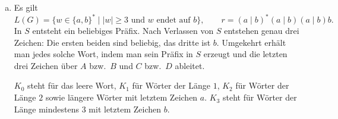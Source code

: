 \begin{loesung}
\begin{enumerate}[a)]
\[K_2=\{q_3,q_4,q_5,q_6\},\quad K_3=\{q_7,q_8\}.
\]
Startzustand ist $K_0$, einziger Endzustand ist $K_3$.
Die Übergangstabelle des minimalen DFA lautet:
\begin{center}
\begin{tabular}{c|cc}
 & $a$ & $b$\\\hline
$\to K_0$ & $K_1$ & $K_1$\\
$K_1$ & $K_2$ & $K_2$\\
$K_2$ & $K_2$ & $K_3$\\
$*K_3$ & $K_2$ & $K_3$
\end{tabular}
\end{center}
Alle vier Zustände sind erreichbar (z.\,B.\ durch $\varepsilon,a,aa,aab$).
$K_3$ ist von allen anderen durch $\varepsilon$ unterscheidbar.
$K_2$ unterscheidet sich von $K_0$ und $K_1$ durch die Fortsetzung $b$.
$K_0$ und $K_1$ unterscheiden sich durch $ab$.
Somit sind alle Paare unterscheidbar und der DFA ist minimal.

\newpage
\item Es gilt
\[
L(G)=\{w\in\{a,b\}^*\mid |w|\geq3\text{ und $w$ endet auf }b\},
\qquad r=(a\mid b)^*(a\mid b)(a\mid b)b.
\]
In $S$ entsteht ein beliebiges Präfix. Nach Verlassen von $S$ entstehen
genau drei Zeichen: Die ersten beiden sind beliebig, das dritte ist $b$.
Umgekehrt erhält man jedes solche Wort, indem man sein Präfix in $S$ erzeugt
und die letzten drei Zeichen über $A$ bzw.\ $B$ und $C$ bzw.\ $D$ ableitet.

$K_0$ steht für das leere Wort, $K_1$ für Wörter der Länge $1$,
$K_2$ für Wörter der Länge $2$ sowie längere Wörter mit letztem Zeichen $a$.
$K_3$ steht für Wörter der Länge mindestens $3$ mit letztem Zeichen $b$.

\end{enumerate}
\end{loesung}


